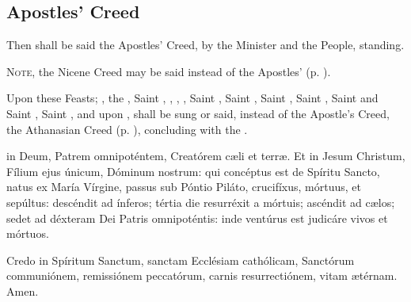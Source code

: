 \subsection{Apostles' Creed}
\begin{rubric}
    Then shall be said the Apostles' Creed, by the Minister and the People, standing.\par%
    \textsc{Note,} the Nicene Creed may be said instead of the Apostles' (p. \pageref{NiceneCreed}).
\end{rubric}
\begin{rubric}
    Upon these Feasts; , the , Saint , , , , Saint , Saint , Saint , Saint , Saint  and Saint , Saint , and upon , shall be sung or said, instead of the Apostle's Creed, the Athanasian Creed (p. \pageref{Ath}), concluding with the .
\end{rubric}
    { in Deum, Patrem omnipoténtem, Creatórem c{\ae}li et terr{\ae}. Et in Jesum Christum, Fílium ejus únicum, Dóminum nostrum: qui concéptus est de Spíritu Sancto, natus ex María Vírgine, passus sub Póntio Piláto, crucifíxus, mórtuus, et sepúltus: descéndit ad ínferos; tértia die resurréxit a mórtuis; ascéndit ad c{\ae}los; sedet ad déxteram Dei Patris omnipoténtis: inde ventúrus est judicáre vivos et mórtuos.\par
     Credo in Spíritum Sanctum, sanctam Ecclésiam cathólicam, Sanctórum communiónem, remissiónem peccatórum, carnis {} resurrectiónem, vitam {\ae}térnam. Amen.}

